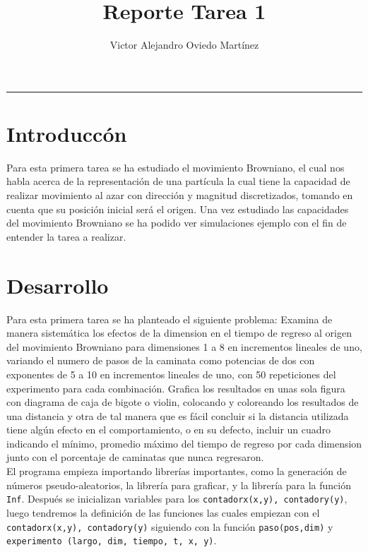 \documentclass{article}
\title{Reporte Tarea 1}
\author{Victor Alejandro Oviedo Martínez}
\begin{document}
\maketitle
\hrule
\section{Introduccón}\label{intro}

Para esta primera tarea se ha estudiado el movimiento Browniano, el cual nos habla acerca de la representación de una partícula la cual tiene la capacidad de realizar movimiento al azar con dirección y magnitud discretizados, tomando en cuenta que su posición inicial será el origen\citep{DRA.P1}. Una vez estudiado las capacidades del movimiento Browniano se ha podido ver simulaciones ejemplo con el fin de entender la tarea a realizar.

\section{Desarrollo}

Para esta primera tarea se ha planteado el siguiente problema:
Examina de manera sistemática los efectos de la dimension en el tiempo de regreso al origen del movimiento Browniano para dimensiones 1 a 8 en incrementos lineales de uno, variando el numero de pasos de la caminata como potencias de dos con exponentes de 5 a 10 en incrementos lineales de uno, con 50 repeticiones del experimento para cada combinación. Grafica los resultados en unas sola figura con diagrama de caja de bigote o violin, colocando y coloreando los resultados de una distancia y otra de tal manera que es fácil concluir si la distancia utilizada tiene algún efecto en el comportamiento, o en su defecto, incluir un cuadro indicando el mínimo, promedio máximo del tiempo de regreso por cada dimension junto con el porcentaje de caminatas que nunca regresaron\citep{DRA.P1}.\\



El programa empieza importando librerías importantes, como la generación de números pseudo-aleatorios, la librería para graficar, y la librería para la función  \texttt{Inf}.   Después se inicializan variables para los \texttt{contadorx(x,y), contadory(y)}, luego tendremos la definición de las funciones las cuales empiezan con el \texttt{contadorx(x,y), contadory(y)} siguiendo con la función \texttt{paso(pos,dim)} y \texttt{experimento (largo, dim, tiempo, t, x, y)}.
\end{document}

